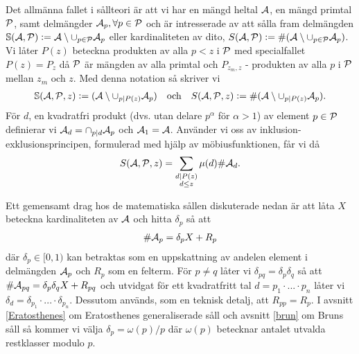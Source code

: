 Det allmänna fallet i sållteori är att vi har en mängd heltal \(\A\), en mängd primtal \(\P\), samt delmängder \(\A_p, \forall p \in \P\) och är intresserade av att sålla fram delmängden \(\mathbb{S}(\A, \P) := \A \setminus \cup_{p \in \P} \A_p\) eller kardinaliteten av dito, \(S(\A, \P) :=\card{(\A \setminus \cup_{p \in \P} \A_p)}\). Vi låter \(P(z)\) beteckna produkten av alla \(p < z\) i \(\P\) med specialfallet \(P(z) = P_z\) då \(\P\) är mängden av alla primtal och \(P_{z_m, z}\) - produkten av alla \(p\) i \(\P\) mellan \(z_m\) och \(z\). Med denna notation så skriver vi %
\begin{align*}
    \mathbb{S}(\A, \P, z) := (\A \setminus \cup_{p \divides P(z)} \A_p)
    \quad \text{och} \quad
    \S{A}{P}{z} := \card{(\A \setminus \cup_{p \divides P(z)} \A_p)} .
\end{align*}
För \(d\), en kvadratfri produkt (dvs. utan delare \(p^\alpha\) för \(\alpha > 1\)) av element \(p \in \P\) definierar vi \(\A_d = \cap_{p \divides d} \A_p\) och \(\A_1 = \A\). Använder vi oss av inklusion-exklusionsprincipen, formulerad med hjälp av möbiusfunktionen, får vi då
\begin{align} \label{inclusionexclusion}
    \S{A}{P}{z} = \sum_{\substack{d \divides P(z) \\ d \leq z}} \mu(d) \card{\A_d} .
\end{align} %

Ett gemensamt drag hos de matematiska sållen diskuterade nedan är att låta \(X\) beteckna kardinaliteten av \(\A\) och hitta \(\delta_p\) så att
\begin{align} 
    \card{\A_p} = \delta_p X + R_p\label{deltaX}
\end{align}
där \(\delta_p \in [0, 1)\) kan betraktas som en uppskattning av andelen element i delmängden \(\A_p\) och \(R_p\) som en felterm. För \(p \neq q\) låter vi \(\delta_{pq} = \delta_p \delta_q\) så att \(\card{\A_{pq}} = \delta_p \delta_q X + R_{pq}\) och utvidgat för ett kvadratfritt tal \(d = p_1 \cdot ... \cdot p_n\) låter vi \(\delta_{d} = \delta_{p_1} \cdot ... \cdot \delta_{p_n}\). Dessutom används, som en teknisk detalj, att \(R_{pp} = R_p\). I avsnitt \ref{Eratosthenes} om Eratosthenes generaliserade såll och avsnitt \ref{brun} om Bruns såll så kommer vi välja \(\delta_p = \omega(p) / p\) där \(\omega(p)\) betecknar antalet utvalda restklasser modulo \(p\).
